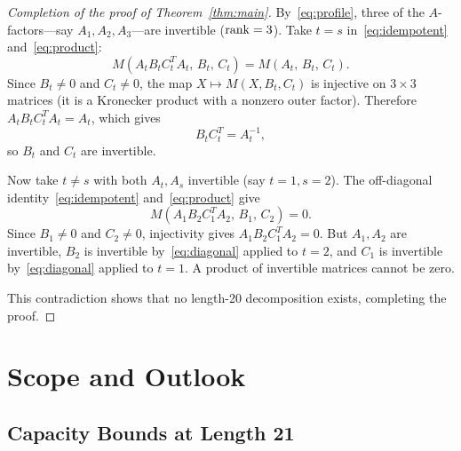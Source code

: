 \documentclass[11pt,a4paper]{article}
\begin{document}
\begin{proof}[Completion of the proof of Theorem~\ref{thm:main}]
  By~\eqref{eq:profile}, three of the $A$-factors---say $A_1,A_2,A_3$---are invertible ($\operatorname{rank}=3$).  Take $t=s$ in~\eqref{eq:idempotent} and~\eqref{eq:product}:
  \[
    M(A_tB_tC_t^TA_t,\,B_t,\,C_t) = M(A_t,\,B_t,\,C_t).
  \]
  Since $B_t\ne 0$ and $C_t\ne 0$, the map $X\mapsto M(X,B_t,C_t)$ is injective on $3\times 3$ matrices (it is a Kronecker product with a nonzero outer factor).  Therefore $A_tB_tC_t^TA_t=A_t$, which gives
  \begin{equation}\label{eq:diagonal}
    B_tC_t^T = A_t^{-1},
  \end{equation}
  so $B_t$ and $C_t$ are invertible.

  Now take $t\ne s$ with both $A_t,A_s$ invertible (say $t=1,s=2$).  The off-diagonal identity~\eqref{eq:idempotent} and~\eqref{eq:product} give
  \begin{equation}\label{eq:off-diagonal-zero}
    M(A_1B_2C_1^TA_2,\,B_1,\,C_2) = 0.
  \end{equation}
  Since $B_1\ne 0$ and $C_2\ne 0$, injectivity gives $A_1B_2C_1^TA_2=0$.  But $A_1,A_2$ are invertible, $B_2$ is invertible by~\eqref{eq:diagonal} applied to $t=2$, and $C_1$ is invertible by~\eqref{eq:diagonal} applied to $t=1$.  A product of invertible matrices cannot be zero.

  This contradiction shows that no length-20 decomposition exists, completing the proof.
\end{proof}


\section{Scope and Outlook}\label{sec:outlook}

\subsection{Capacity Bounds at Length 21}
\end{document}
